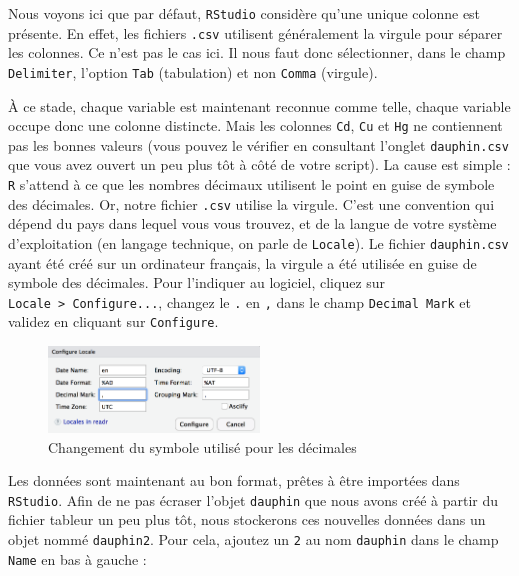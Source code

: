 \documentclass[
  a4paper,
  DIV=11,
  numbers=noendperiod,
  oneside]{scrreprt}
\begin{document}
Nous voyons ici que par défaut, \texttt{RStudio} considère qu'une unique
colonne est présente. En effet, les fichiers \texttt{.csv} utilisent
généralement la virgule pour séparer les colonnes. Ce n'est pas le cas
ici. Il nous faut donc sélectionner, dans le champ \texttt{Delimiter},
l'option \texttt{Tab} (tabulation) et non \texttt{Comma} (virgule).

À ce stade, chaque variable est maintenant reconnue comme telle, chaque
variable occupe donc une colonne distincte. Mais les colonnes
\texttt{Cd}, \texttt{Cu} et \texttt{Hg} ne contiennent pas les bonnes
valeurs (vous pouvez le vérifier en consultant l'onglet
\texttt{dauphin.csv} que vous avez ouvert un peu plus tôt à côté de
votre script). La cause est simple : \texttt{R} s'attend à ce que les
nombres décimaux utilisent le point en guise de symbole des décimales.
Or, notre fichier \texttt{.csv} utilise la virgule. C'est une convention
qui dépend du pays dans lequel vous vous trouvez, et de la langue de
votre système d'exploitation (en langage technique, on parle de
\texttt{Locale}). Le fichier \texttt{dauphin.csv} ayant été créé sur un
ordinateur français, la virgule a été utilisée en guise de symbole des
décimales. Pour l'indiquer au logiciel, cliquez sur
\texttt{Locale\ \textgreater{}\ Configure...}, changez le \texttt{.} en
\texttt{,} dans le champ \texttt{Decimal\ Mark} et validez en cliquant
sur \texttt{Configure}.

\begin{figure}[H]

{\centering \includegraphics[width=0.5\textwidth,height=\textheight]{images/importcsv3.png}

}

\caption{Changement du symbole utilisé pour les décimales}

\end{figure}%

Les données sont maintenant au bon format, prêtes à être importées dans
\texttt{RStudio}. Afin de ne pas écraser l'objet \texttt{dauphin} que
nous avons créé à partir du fichier tableur un peu plus tôt, nous
stockerons ces nouvelles données dans un objet nommé \texttt{dauphin2}.
Pour cela, ajoutez un \texttt{2} au nom \texttt{dauphin} dans le champ
\texttt{Name} en bas à gauche :
\end{document}
